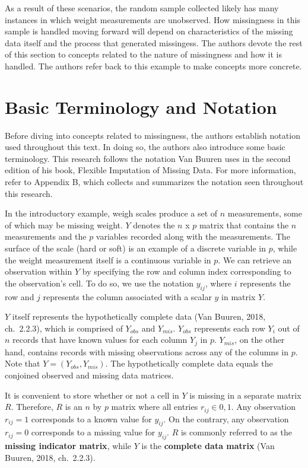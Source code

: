 \documentclass[12pt,oneside]{chicagocapstone}
\begin{document}
As a result of these scenarios, the random sample collected likely has
many instances in which weight measurements are unobserved. How
missingness in this sample is handled moving forward will depend on
characteristics of the missing data itself and the process that
generated missingess. The authors devote the rest of this section to
concepts related to the nature of missingness and how it is handled. The
authors refer back to this example to make concepts more concrete.

\section*{Basic Terminology and Notation}\label{background-basic-terms}

Before diving into concepts related to missingness, the authors
establish notation used throughout this text. In doing so, the authors
also introduce some basic terminology. This research follows the
notation Van Buuren uses in the second edition of his book, Flexible
Imputation of Missing Data. For more information, refer to Appendix B,
which collects and summarizes the notation seen throughout this
research.

In the introductory example, weigh scales produce a set of \(n\)
measurements, some of which may be missing weight. \(Y\) denotes the
\(n\) x \(p\) matrix that contains the \(n\) measurements and the \(p\)
variables recorded along with the measurements. The surface of the scale
(hard or soft) is an example of a discrete variable in \(p\), while the
weight measurement itself is a continuous variable in \(p\). We can
retrieve an observation within \(Y\) by specifying the row and column
index corresponding to the observation's cell. To do so, we use the
notation \(y_{ij}\), where \(i\) represents the row and \(j\) represents
the column associated with a scalar \(y\) in matrix \(Y\).

\(Y\) itself represents the hypothetically complete data (Van Buuren,
2018, ch.~2.2.3), which is comprised of \(Y_{obs}\) and \(Y_{mis}\).
\(Y_{obs}\) represents each row \(Y_i\) out of \(n\) records that have
known values for each column \(Y_j\) in \(p\). \(Y_{mis}\), on the other
hand, contains records with missing observations across any of the
columns in \(p\). Note that \(Y = (Y_{obs}, Y_{mis})\). The
hypothetically complete data equals the conjoined observed and missing
data matrices.

It is convenient to store whether or not a cell in \(Y\) is missing in a
separate matrix \(R\). Therefore, \(R\) is an \(n\) by \(p\) matrix
where all entries \(r_{ij} \in {0, 1}\). Any observation \(r_{ij}=1\)
corresponds to a known value for \(y_{ij}\). On the contrary, any
observation \(r_{ij}=0\) corresponds to a missing value for \(y_{ij}\).
\(R\) is commonly referred to as the \textbf{missing indicator matrix},
while \(Y\) is the \textbf{complete data matrix} (Van Buuren, 2018,
ch.~2.2.3).
\end{document}
